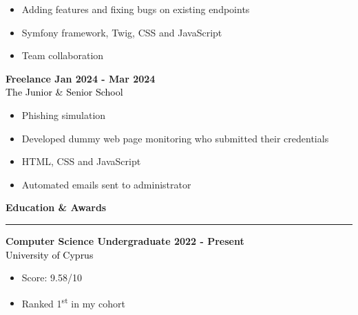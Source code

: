 \documentclass[12pt]{article}
\begin{document}
\begin{paracol}{2}
{\begin{itemize}[leftmargin=33pt, itemsep=0pt, topsep=0pt]
         \item Adding features and fixing bugs on existing endpoints\\
            \item Symfony framework, Twig, CSS and JavaScript\\
            \item Team collaboration\\
         \end{itemize}
      }
      \vspace{0.5cm}
      \textbf{\textcolor{bgcolor}{Freelance \hfill Jan 2024 - Mar 2024}}\\[0.5em]
      \textcolor{black}{The Junior \& Senior School}\\[0.5em]
      {\renewcommand{\labelitemi}{\textcolor{bgcolor}{\normalsize$\bullet$}}%
      \begin{itemize}[leftmargin=33pt, itemsep=0pt, topsep=0pt]
            \item Phishing simulation\\
            \item Developed dummy web page monitoring who submitted their credentials\\
            \item HTML, CSS and JavaScript\\
            \item Automated emails sent to administrator\\
         \end{itemize}
      }
      \vspace{1cm}
      {\fontsize{14pt}{13pt}\selectfont
      \textbf{\textcolor{bgcolor}{Education \& Awards}}\\[0.3em]
      }
      \hrule
      \vspace{0.5cm}
      \textbf{\textcolor{bgcolor}{Computer Science Undergraduate \hfill 2022 - Present}}\\[0.5em]
      \textcolor{black}{University of Cyprus}\\[0.5em]
      {\renewcommand{\labelitemi}{\textcolor{bgcolor}{\normalsize$\bullet$}}%
      \begin{itemize}[leftmargin=33pt, itemsep=0pt, topsep=0pt]
            \item Score: 9.58/10\\
            \item Ranked 1\textsuperscript{st} in my cohort\\
         \end{itemize}
}
\end{paracol}
\end{document}
